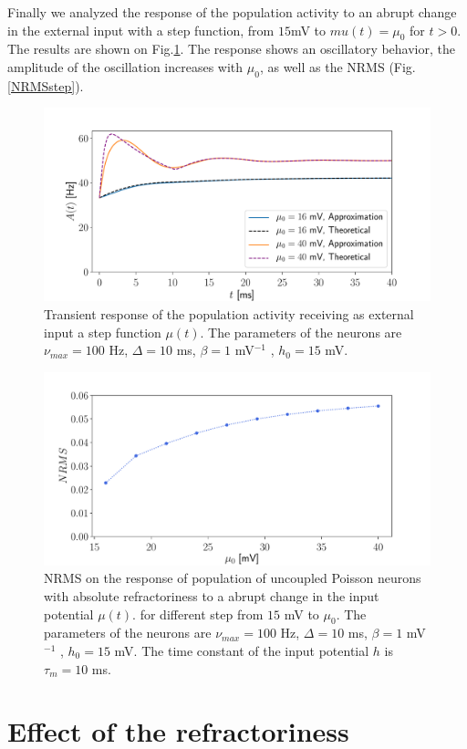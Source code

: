 \documentclass[12pt,twoside]{report}
\begin{document}
Finally we analyzed the response of the population activity to an abrupt change in the external input with a step function, from $15$mV to $mu(t)=\mu_0$ for $t>0$. The results are shown on Fig.\ref{fig:Astep}. The response shows an oscillatory behavior, the amplitude of the oscillation increases with $\mu_0$, as well as the NRMS (Fig.\ref{NRMSstep}).

\begin{figure}[h!]
	\centering
	\includegraphics[width=0.8\linewidth]{Astep.pdf}
	\caption{Transient response of the population activity receiving as external input a step function $\mu(t)$. The parameters of the neurons are $\nu_{max}=100$ Hz, $\Delta=10$ ms, $\beta=1$ mV$^{-1}$ , $h_0=15$ mV. 
	}
	\label{fig:Astep}
\end{figure}

\begin{figure}[h!]
	\centering
	\includegraphics[width=0.8\linewidth]{NRMSstep.pdf}
	\caption{NRMS on the response of population of uncoupled Poisson neurons with absolute refractoriness to a abrupt change in the input potential $\mu(t)$. for different step from $15$ mV to $\mu_0$. The parameters of the neurons are $\nu_{max}=100$ Hz, $\Delta=10$ ms, $\beta=1$ mV$^{-1}$ , $h_0=15$ mV. The time constant of the input potential $h$ is $\tau_m=10$ ms.
	}
	\label{fig:NRMSstep}
\end{figure}

\section{Effect of the refractoriness}
\end{document}
